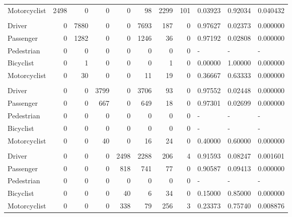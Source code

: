 \documentclass[]{elsarticle} %
\begin{document}
\begin{table}
{\begin{tabular}[t]{lrrrrrrrlll}
\hspace{1em}Motorcyclist & 2498 & 0 & 0 & 0 & 98 & 2299 & 101 & 0.03923 & 0.92034 & 0.040432\\
\rowcolor{gray!6}  \addlinespace[0.3em]
\multicolumn{11}{l}{\textbf{Opponent: Pedestrian}}\\
\hspace{1em}Driver & 0 & 7880 & 0 & 0 & 7693 & 187 & 0 & 0.97627 & 0.02373 & 0.000000\\
\hspace{1em}Passenger & 0 & 1282 & 0 & 0 & 1246 & 36 & 0 & 0.97192 & 0.02808 & 0.000000\\
\rowcolor{gray!6}  \hspace{1em}Pedestrian & 0 & 0 & 0 & 0 & 0 & 0 & 0 & - & - & \vphantom{2} -\\
\hspace{1em}Bicyclist & 0 & 1 & 0 & 0 & 0 & 1 & 0 & 0.00000 & 1.00000 & 0.000000\\
\rowcolor{gray!6}  \hspace{1em}Motorcyclist & 0 & 30 & 0 & 0 & 11 & 19 & 0 & 0.36667 & 0.63333 & 0.000000\\
\addlinespace[0.3em]
\multicolumn{11}{l}{\textbf{Opponent: Bicyclist}}\\
\hspace{1em}Driver & 0 & 0 & 3799 & 0 & 3706 & 93 & 0 & 0.97552 & 0.02448 & 0.000000\\
\rowcolor{gray!6}  \hspace{1em}Passenger & 0 & 0 & 667 & 0 & 649 & 18 & 0 & 0.97301 & 0.02699 & 0.000000\\
\hspace{1em}Pedestrian & 0 & 0 & 0 & 0 & 0 & 0 & 0 & - & - & \vphantom{1} -\\
\rowcolor{gray!6}  \hspace{1em}Bicyclist & 0 & 0 & 0 & 0 & 0 & 0 & 0 & - & - & -\\
\hspace{1em}Motorcyclist & 0 & 0 & 40 & 0 & 16 & 24 & 0 & 0.40000 & 0.60000 & 0.000000\\
\rowcolor{gray!6}  \addlinespace[0.3em]
\multicolumn{11}{l}{\textbf{Opponent: Motorcyclist}}\\
\hspace{1em}Driver & 0 & 0 & 0 & 2498 & 2288 & 206 & 4 & 0.91593 & 0.08247 & 0.001601\\
\hspace{1em}Passenger & 0 & 0 & 0 & 818 & 741 & 77 & 0 & 0.90587 & 0.09413 & 0.000000\\
\rowcolor{gray!6}  Pedestrian & 0 & 0 & 0 & 0 & 0 & 0 & 0 & - & - & \vphantom{2} -\\
\hspace{1em}Bicyclist & 0 & 0 & 0 & 40 & 6 & 34 & 0 & 0.15000 & 0.85000 & 0.000000\\
\rowcolor{gray!6}  \hspace{1em}Motorcyclist & 0 & 0 & 0 & 338 & 79 & 256 & 3 & 0.23373 & 0.75740 & 0.008876\\
\bottomrule
\end{tabular}}
\end{table}
\end{document}
